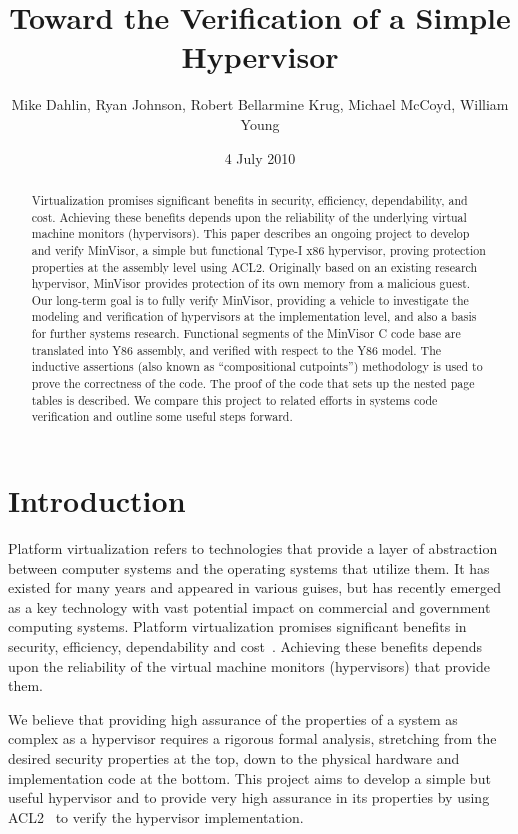\documentclass[submission,copyright]{eptcs} \providecommand{\event}{ACL2 2011}
\title{Toward the Verification of a Simple Hypervisor}
\author{Mike Dahlin, Ryan Johnson, Robert Bellarmine Krug, Michael McCoyd, William Young
\institute{Department of Computer Sciences\\
University of Texas at Austin}
\email{\{dahlin, rjohnson, rkrug, mccoyd, byoung\}@cs.utexas.edu}
}
\date{4 July 2010}
\begin{document}
\maketitle

\begin{abstract}
Virtualization promises significant benefits in security, efficiency,
dependability, and cost.  Achieving these benefits depends upon
the reliability of the underlying virtual machine monitors
(hypervisors).  This paper describes an ongoing project to develop and
verify MinVisor, a simple but functional Type-I x86 hypervisor,
proving protection properties at the assembly level using ACL2.
Originally based on an existing research hypervisor, MinVisor provides
protection of its own memory from a malicious guest.  Our long-term
goal is to fully verify MinVisor, providing a vehicle to
investigate the modeling and verification of hypervisors at the
implementation level, and also a basis for further systems research.
Functional segments of the MinVisor C code base are translated into
Y86 assembly, and verified with respect to the Y86 model.  The
inductive assertions (also known as ``compositional cutpoints'')
methodology is used to prove the correctness of the code. The proof of
the code that sets up the nested page tables is described.  We compare
this project to related efforts in systems code verification and
outline some useful steps forward.
\end{abstract}





\section{Introduction}
\label{Introduction}

Platform virtualization refers to technologies that provide a layer of
abstraction between computer systems and the operating systems that
utilize them.  It has existed for many years and appeared in various
guises, but has recently emerged as a key technology with vast
potential impact on commercial and government computing
systems. Platform virtualization promises significant benefits in
security, efficiency, dependability and cost~\cite{HessNewman}.
Achieving these benefits depends upon the reliability of the virtual
machine monitors (hypervisors) that provide them.

We believe that providing high assurance of the properties of a system
as complex as a hypervisor requires a rigorous formal analysis,
stretching from the desired security properties at the top, down to
the physical hardware and implementation code at the bottom.  This
project aims to develop a simple but useful hypervisor and to provide
very high assurance in its properties by using ACL2~\cite{ACL2Book}
to verify the hypervisor implementation.
\end{document}
